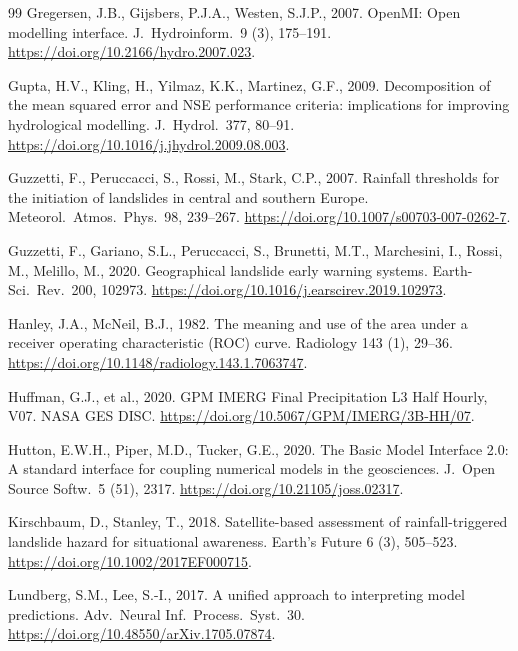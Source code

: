 \documentclass[authoryear,preprint,review,12pt]{elsarticle}
\begin{document}
\begin{thebibliography}{99}
Gregersen, J.B., Gijsbers, P.J.A., Westen, S.J.P., 2007. OpenMI: Open modelling
interface. J.\ Hydroinform.\ 9 (3), 175--191.
\url{https://doi.org/10.2166/hydro.2007.023}.

Gupta, H.V., Kling, H., Yilmaz, K.K., Martinez, G.F., 2009. Decomposition of the
mean squared error and NSE performance criteria: implications for improving
hydrological modelling. J.\ Hydrol.\ 377, 80--91.
\url{https://doi.org/10.1016/j.jhydrol.2009.08.003}.

Guzzetti, F., Peruccacci, S., Rossi, M., Stark, C.P., 2007. Rainfall thresholds
for the initiation of landslides in central and southern Europe. Meteorol.\
Atmos.\ Phys.\ 98, 239--267. \url{https://doi.org/10.1007/s00703-007-0262-7}.

Guzzetti, F., Gariano, S.L., Peruccacci, S., Brunetti, M.T., Marchesini, I.,
Rossi, M., Melillo, M., 2020. Geographical landslide early warning systems.
Earth-Sci.\ Rev.\ 200, 102973.
\url{https://doi.org/10.1016/j.earscirev.2019.102973}.

Hanley, J.A., McNeil, B.J., 1982. The meaning and use of the area under a
receiver operating characteristic (ROC) curve. Radiology 143 (1), 29--36.
\url{https://doi.org/10.1148/radiology.143.1.7063747}.

Huffman, G.J., et al., 2020. GPM IMERG Final Precipitation L3 Half Hourly, V07.
NASA GES DISC. \url{https://doi.org/10.5067/GPM/IMERG/3B-HH/07}.

Hutton, E.W.H., Piper, M.D., Tucker, G.E., 2020. The Basic Model Interface 2.0: A
standard interface for coupling numerical models in the geosciences. J.\ Open
Source Softw.\ 5 (51), 2317. \url{https://doi.org/10.21105/joss.02317}.

Kirschbaum, D., Stanley, T., 2018. Satellite-based assessment of
rainfall-triggered landslide hazard for situational awareness. Earth's Future 6
(3), 505--523. \url{https://doi.org/10.1002/2017EF000715}.

Lundberg, S.M., Lee, S.-I., 2017. A unified approach to interpreting model
predictions. Adv.\ Neural Inf.\ Process.\ Syst.\ 30.
\url{https://doi.org/10.48550/arXiv.1705.07874}.


\end{thebibliography}
\end{document}

